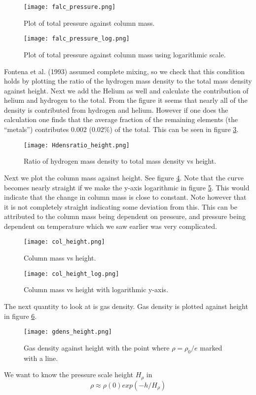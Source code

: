 \documentclass{aa}   %
\begin{document}
\begin{figure}
 \texttt{[image: falc\_pressure.png]}
 \caption{Plot of total pressure against column mass.}
 \label{falc_pressure} 
\end{figure}
\begin{figure}
 \texttt{[image: falc\_pressure\_log.png]}
 \caption{Plot of total pressure against column mass using logarithmic scale.}
 \label{falc_pressure_log} 
\end{figure}

Fontena et al. (1993) assumed complete mixing, so we check that this condition holds by plotting the ratio of the hydrogen mass density to the total mass density against height. Next we add the Helium as well and calculate the contribution of helium and hydrogen to the total. From the figure it seems that nearly all of the density is contributed from hydrogen and helium. However if one does the calculation one finds that the average fraction of the remaining elements (the ``metals'') contributes $0.002$ ($0.02 \%$) of the total. This can be seen in figure \ref{Hdensratio_height}.
\begin{figure}
 \texttt{[image: Hdensratio\_height.png]}
 \caption{Ratio of hydrogen mass density to total mass density vs height.}
 \label{Hdensratio_height} 
\end{figure}
Next we plot the column mass against height. See figure \ref{colm_height}. Note that the curve becomes nearly straight if we make the y-axis logarithmic in figure \ref{colm_height_log}. This would indicate that the change in column mass is close to constant. Note however that it is not completely straight indicating some deviation from this. This can be attributed to the column mass being dependent on pressure, and pressure being dependent on temperature which we saw earlier was very complicated.
\begin{figure}
 \texttt{[image: col\_height.png]}
 \caption{Column mass vs height.}
 \label{colm_height} 
\end{figure}

\begin{figure}
 \texttt{[image: col\_height\_log.png]}
 \caption{Column mass vs height with logarithmic y-axis.}
 \label{colm_height_log} 
\end{figure}

The next quantity to look at is gas density. Gas density is plotted against height in figure \ref{gdens_height}.
\begin{figure}
 \texttt{[image: gdens\_height.png]}
 \caption{Gas density against height with the point where $\rho = \rho_0/e$ marked with a line.}
 \label{gdens_height} 
\end{figure}
We want to know the pressure scale height $H_\rho$ in  
\begin{equation}
 \rho \approx \rho(0)exp(-h/H_{\rho})
\end{equation}
\end{document}
